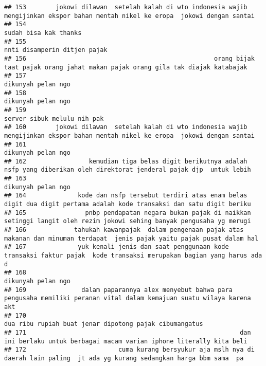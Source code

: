 \documentclass[
]{article}
\begin{document}
\begin{verbatim}
## 153        jokowi dilawan  setelah kalah di wto indonesia wajib mengijinkan ekspor bahan mentah nikel ke eropa  jokowi dengan santai
## 154                                                                                                            sudah bisa kak thanks
## 155                                                                                                     nnti disamperin ditjen pajak
## 156                                                   orang bijak taat pajak orang jahat makan pajak orang gila tak diajak katabajak
## 157                                                                                                         dikunyah pelan ngo      
## 158                                                                                                         dikunyah pelan ngo      
## 159                                                                                                     server sibuk melulu nih pak 
## 160        jokowi dilawan  setelah kalah di wto indonesia wajib mengijinkan ekspor bahan mentah nikel ke eropa  jokowi dengan santai
## 161                                                                                                         dikunyah pelan ngo      
## 162                 kemudian tiga belas digit berikutnya adalah nsfp yang diberikan oleh direktorat jenderal pajak djp  untuk lebih 
## 163                                                                                                         dikunyah pelan ngo      
## 164              kode dan nsfp tersebut terdiri atas enam belas digit dua digit pertama adalah kode transaksi dan satu digit beriku 
## 165                pnbp pendapatan negara bukan pajak di naikkan setinggi langit oleh rezim jokowi sehing banyak pengusaha yg merugi
## 166             tahukah kawanpajak  dalam pengenaan pajak atas makanan dan minuman terdapat  jenis pajak yaitu pajak pusat dalam hal
## 167              yuk kenali jenis dan saat penggunaan kode transaksi faktur pajak  kode transaksi merupakan bagian yang harus ada d 
## 168                                                                                                         dikunyah pelan ngo      
## 169               dalam paparannya alex menyebut bahwa para pengusaha memiliki peranan vital dalam kemajuan suatu wilaya karena akt 
## 170                                                                           dua ribu rupiah buat jenar dipotong pajak cibumangatus
## 171                                                          dan ini berlaku untuk berbagai macam varian iphone literally kita beli 
## 172                         cuma kurang bersyukur aja mslh nya di daerah lain paling  jt ada yg kurang sedangkan harga bbm sama  pa 

\end{verbatim}
\end{document}
